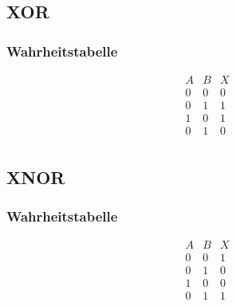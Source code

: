 \subsection{XOR}
\subsubsection{Wahrheitstabelle}
\begin{table}[h!]
\[ \begin{array}{cc|c}
A&B&X\\
\hline
0&0&0\\
0&1&1\\
1&0&1\\
0&1&0\\
\end{array} \]
\end{table}

\subsection{XNOR}
\subsubsection{Wahrheitstabelle}
\begin{table}[h!]
\[ \begin{array}{cc|c}
A&B&X\\
\hline
0&0&1\\
0&1&0\\
1&0&0\\
0&1&1\\
\end{array} \]
\end{table}

